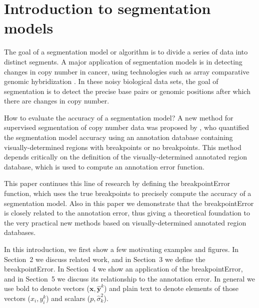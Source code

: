 \documentclass{jsfds} %
\begin{document}
  \begin{AMSclass}
  \end{AMSclass}
 
\newpage

\section{Introduction to segmentation models}

The goal of a segmentation model or algorithm is to divide a series of
data into distinct segments. A major application of segmentation
models is in detecting changes in copy number in cancer, using
technologies such as array comparative genomic hybridization
\citep{PSS98}. In these noisy biological data sets, the goal of
segmentation is to detect the precise base pairs or genomic positions after
which there are changes in copy number.

How to evaluate the accuracy of a segmentation model? A new method for
supervised segmentation of copy number data was proposed by
\citet{HOCKING-breakpoints}, who quantified the segmentation model
accuracy using an annotation database containing visually-determined
regions with breakpoints or no breakpoints.
This method depends critically on the
definition of the visually-determined annotated region database, which
is used to compute an annotation error function. 

This paper continues
this line of research by defining the breakpointError function, which
uses the true breakpoints to precisely compute the accuracy of a
segmentation model. Also in this paper we demonstrate that the
breakpointError is closely related to the annotation error, thus
giving a theoretical foundation to the very practical new methods
based on visually-determined annotated region databases.

In this introduction, we first show a few motivating examples and
figures. In Section~2 we discuss related work, and in Section~3 we
define the breakpointError. In Section~4 we show an
application of the breakpointError, and in Section~5 we discuss its
relationship to the annotation error. In general we use bold to denote
vectors ($\mathbf x, \mathbf{\hat y}^k$) and plain text to denote
elements of those vectors ($x_i, y_i^k$) and scalars ($p, \hat
\sigma^2_k$).
\end{document}
